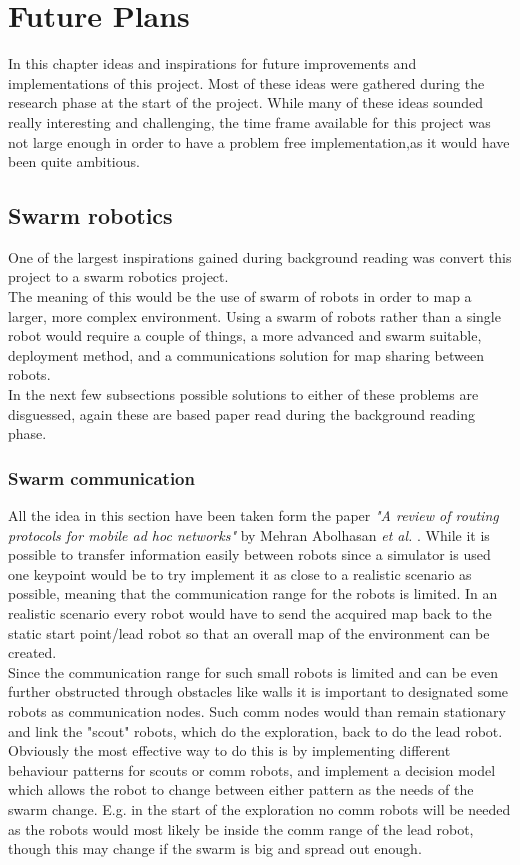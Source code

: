 \chapter{Future Plans}
\label{Future_plans}
In this chapter ideas and inspirations for future improvements and implementations of this project. 
Most of these ideas were gathered during the research phase at the start of the project. While many of these ideas sounded really interesting and challenging, the time frame available for this project was not large enough in order to have a problem free implementation,as it would have been quite ambitious. 

\section{Swarm robotics}
One of the largest inspirations gained during background reading was convert this project to a swarm robotics project. \\
The meaning of this would be the use of swarm of robots in order to map a larger, more complex environment. Using a swarm of robots rather than a single robot would require a couple of things, a more advanced and swarm suitable, deployment method, 
and a communications solution for map sharing between robots. \\[3ex]

In the next few subsections possible solutions to either of these problems are disguessed, again these are based paper read during the background reading phase.
\subsection{Swarm communication}
\label{communication}
All the idea in this section have been taken form the paper \textit{"A review of routing protocols for mobile ad hoc networks"} by Mehran Abolhasan \textit{et al.} \cite{Abolhasan2004Review}.
While it is possible to transfer information easily between robots since a simulator is used one keypoint would be to try implement it as close to a realistic scenario as possible, meaning that the communication range for the robots is limited. In an realistic scenario every robot would have to send the acquired map back to the static start point/lead robot so that an overall map of the environment can be created. \\
Since the communication range for such small robots is limited and can be even further obstructed through obstacles like walls it is important to designated some robots as communication nodes. Such comm nodes would than remain stationary and link the "scout" robots, which do the exploration, back to do the lead robot. \\
Obviously the most effective way to do this is by implementing different behaviour patterns for scouts or comm robots, and implement a decision model which allows the robot to change between either pattern as the needs of the swarm change. E.g. in the start of the exploration no comm robots will be needed as the robots would most likely be inside the comm range of the lead robot, though this may change if the swarm is big and spread out enough. \\[3ex]

